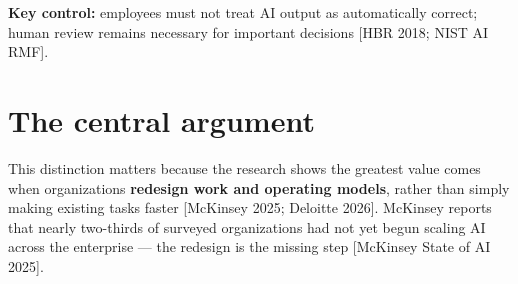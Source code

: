 \textbf{Key control:} employees must not treat AI output as automatically
correct; human review remains necessary for important decisions
[HBR 2018; NIST AI RMF].

\section{The central argument}

\begin{center}
\end{center}

This distinction matters because the research shows the greatest value comes
when organizations \textbf{redesign work and operating models}, rather than
simply making existing tasks faster [McKinsey 2025; Deloitte 2026]. McKinsey
reports that nearly two-thirds of surveyed organizations had not yet begun
scaling AI across the enterprise — the redesign is the missing step
[McKinsey State of AI 2025].


